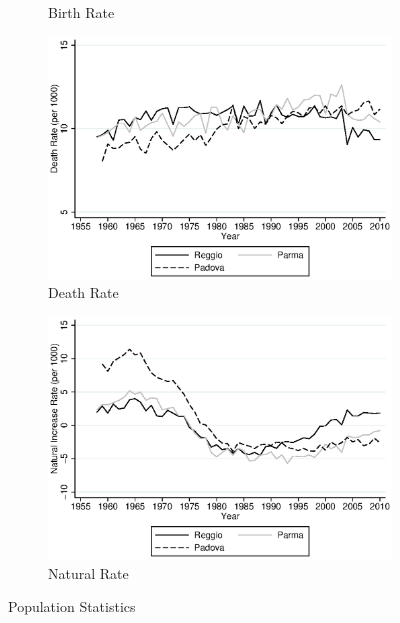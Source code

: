 \begin{figure}[H]
\begin{subfigure}[t]{0.49\textwidth}
 \caption{Birth Rate}        
        \end{subfigure}
        \begin{subfigure}[t]{0.49\textwidth}
          \includegraphics[width=\textwidth]{../../output/image/death_rate.eps} 
        \caption{Death Rate}        
        \end{subfigure}
        \begin{subfigure}[t]{0.49\textwidth}
          \includegraphics[width=\textwidth]{../../output/image/naturalinc_rate.eps}
            \caption{Natural Rate}       
        \end{subfigure}
      \caption{Population Statistics}  \label{fig:population}
    \end{figure}
    
